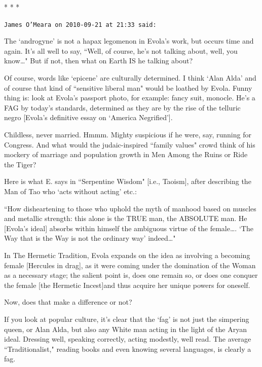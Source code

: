 
\begin{center}* * *\end{center}

\begin{footnotesize}\begin{sffamily}



\texttt{James O'Meara on 2010-09-21 at 21:33 said: }

The `androgyne' is not a hapax legomenon in Evola's work, but occurs time and again. It's all well to say, ``Well, of course, he's not talking about, well, you know…" But if not, then what on Earth IS he talking about? 

Of course, words like `epicene' are culturally determined. I think `Alan Alda' and of course that kind of ``sensitive liberal man" would be loathed by Evola. Funny thing is: look at Evola's passport photo, for example: fancy suit, monocle. He's a FAG by today's standards, determined as they are by the rise of the telluric negro [Evola's definitive essay on `America Negrified’].

Childless, never married. Hmmm. Mighty suspicious if he were, say, running for Congress. And what would the judaic-inspired ``family values" crowd think of his mockery of marriage and population growth in Men Among the Ruins or Ride the Tiger?

Here is what E. says in ``Serpentine Wisdom" [i.e., Taoism], after describing the Man of Tao who `acts without acting' etc.:

``How disheartening to those who uphold the myth of manhood based on muscles and metallic strength: this alone is the TRUE man, the ABSOLUTE man. He [Evola's ideal] absorbs within himself the ambiguous virtue of the female…. `The Way that is the Way is not the ordinary way' indeed…"

In The Hermetic Tradition, Evola expands on the idea as involving a becoming female [Hercules in drag], as it were coming under the domination of the Woman as a necessary stage; the salient point is, does one remain so, or does one conquer the female [the Hermetic Incest]and thus acquire her unique powers for oneself. 

Now, does that make a difference or not? 

If you look at popular culture, it's clear that the `fag' is not just the simpering queen, or Alan Alda, but also any White man acting in the light of the Aryan ideal. Dressing well, speaking correctly, acting modestly, well read. The average ``Traditionalist," reading books and even knowing several languages, is clearly a fag. 


\end{sffamily}
\end{footnotesize}
